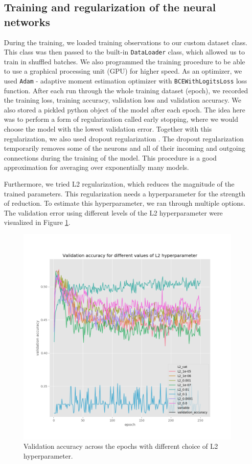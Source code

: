 \subsection{Training and regularization of the neural networks}
During the training, we loaded training observations to our custom dataset class.
This class was then passed to the built-in \verb'DataLoader' class, which allowed us to train in shuffled batches.
We also programmed the training procedure to be able to use a graphical processing unit (GPU) for higher speed.
As an optimizer, we used \verb'Adam' - adaptive moment estimation optimizer \cite{kingma2014adam} with \verb'BCEWithLogitsLoss' loss function. 
After each run through the whole training dataset (epoch), we recorded the training loss, training accuracy, validation loss and validation accuracy.
We also stored a pickled python object of the model after each epoch.
The idea here was to perform a form of regularization called early stopping, where we would choose the model with the lowest validation error.
Together with this regularization, we also used dropout regularization \cite{srivastava2014dropout}.
The dropout regularization temporarily removes some of the neurons and all of their incoming and outgoing connections during the training of the model. 
This procedure is a good approximation for averaging over exponentially many models.

Furthermore, we tried L2 regularization, which reduces the magnitude of the trained parameters. 
This regularization needs a hyperparameter for the strength of reduction. 
To estimate this hyperparameter, we ran through multiple options.
The validation error using different levels of the L2 hyperparameter were visualized in Figure \ref{fig:L2_reg}.

\begin{figure}
    \centering
    \includegraphics[width=0.7\linewidth]{images/val_acc_v2.png}
    \caption[L2 choice]{Validation accuracy across the epochs with different choice of L2 hyperparameter.}
    \label{fig:L2_reg}
\end{figure}
